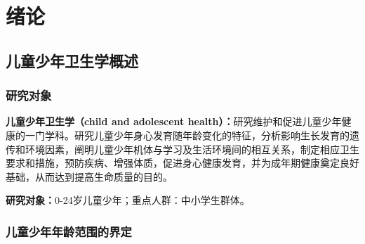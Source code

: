 \chapter{绪论}
\setcounter{chapter}{1}

\section{儿童少年卫生学概述}

\subsection{研究对象}

\begin{defbox}
\textbf{儿童少年卫生学（child and adolescent health）：}研究维护和促进儿童少年健康的一门学科。研究儿童少年身心发育随年龄变化的特征，分析影响生长发育的遗传和环境因素，阐明儿童少年机体与学习及生活环境间的相互关系，制定相应卫生要求和措施，预防疾病、增强体质，促进身心健康发育，并为成年期健康奠定良好基础，从而达到提高生命质量的目的。

\textbf{研究对象：}0-24岁儿童少年；重点人群：中小学生群体。
\end{defbox}

\subsection{儿童少年年龄范围的界定}

